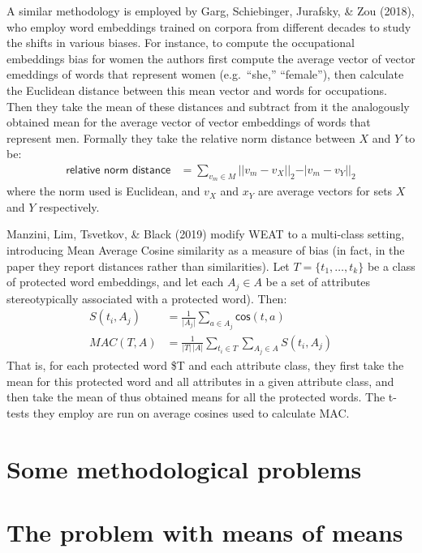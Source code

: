 \documentclass[
  10pt,
  dvipsnames,enabledeprecatedfontcommands]{scrartcl}
\begin{document}
A similar methodology is employed by Garg, Schiebinger, Jurafsky, \& Zou
(2018), who employ word embeddings trained on corpora from different
decades to study the shifts in various biases. For instance, to compute
the occupational embeddings bias for women the authors first compute the
average vector of vector emeddings of words that represent women
(e.g.~``she,'' ``female''), then calculate the Euclidean distance
between this mean vector and words for occupations. Then they take the
mean of these distances and subtract from it the analogously obtained
mean for the average vector of vector embeddings of words that represent
men. Formally they take the relative norm distance between \(X\) and
\(Y\) to be: \begin{align}
\textsf{relative norm distance} & = \sum_{v_m\in M} \vert \vert v_m - v_X\vert \vert_2 - \vert v_m - v_Y\vert \vert_2
\end{align} \noindent where the norm used is Euclidean, and \(v_X\) and
\(x_Y\) are average vectors for sets \(X\) and \(Y\) respectively.

Manzini, Lim, Tsvetkov, \& Black (2019) modify WEAT to a multi-class
setting, introducing Mean Average Cosine similarity as a measure of bias
(in fact, in the paper they report distances rather than similarities).
Let \(T = \{t_1, \dots, t_k\}\) be a class of protected word embeddings,
and let each \(A_j\in A\) be a set of attributes stereotypically
associated with a protected word). Then: \begin{align}
S(t_i, A_j) & = \frac{1}{\vert A_j\vert}\sum_{a\in A_j}\mathsf{cos}(t,a) \\
MAC(T,A) & = \frac{1}{\vert T \vert \,\vert A\vert}\sum_{t_i \in T }\sum_{A_j \in A} S(t_i,A_j)
\end{align} That is, for each protected word \$T and each attribute
class, they first take the mean for this protected word and all
attributes in a given attribute class, and then take the mean of thus
obtained means for all the protected words. The t-tests they employ are
run on average cosines used to calculate MAC.

\hypertarget{some-methodological-problems}{%
\section{Some methodological
problems}\label{some-methodological-problems}}

\hypertarget{the-problem-with-means-of-means}{%
\section{The problem with means of
means}\label{the-problem-with-means-of-means}}
\end{document}
